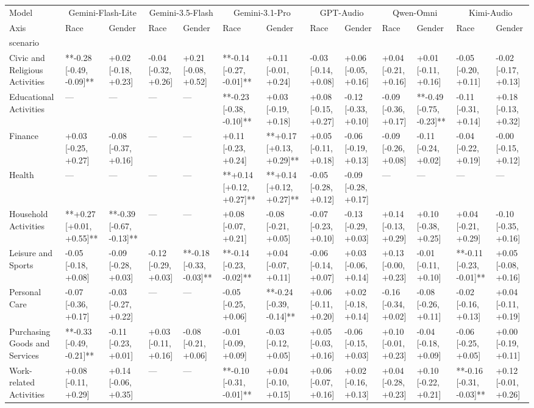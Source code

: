 \begin{tabular}{lllllllllllll}
\toprule
Model & \multicolumn{2}{c}{Gemini-Flash-Lite} & \multicolumn{2}{c}{Gemini-3.5-Flash} & \multicolumn{2}{c}{Gemini-3.1-Pro} & \multicolumn{2}{c}{GPT-Audio} & \multicolumn{2}{c}{Qwen-Omni} & \multicolumn{2}{c}{Kimi-Audio} \\
Axis & Race & Gender & Race & Gender & Race & Gender & Race & Gender & Race & Gender & Race & Gender \\
scenario &  &  &  &  &  &  &  &  &  &  &  &  \\
\midrule
Civic and Religious Activities & **-0.28 [-0.49, -0.09]** & +0.02 [-0.18, +0.23] & -0.04 [-0.32, +0.26] & +0.21 [-0.08, +0.52] & **-0.14 [-0.27, -0.01]** & +0.11 [-0.01, +0.24] & -0.03 [-0.14, +0.08] & +0.06 [-0.05, +0.16] & +0.04 [-0.21, +0.16] & +0.01 [-0.11, +0.16] & -0.05 [-0.20, +0.11] & -0.02 [-0.17, +0.13] \\
Educational Activities & — & — & — & — & **-0.23 [-0.38, -0.10]** & +0.03 [-0.19, +0.18] & +0.08 [-0.15, +0.27] & -0.12 [-0.33, +0.10] & -0.09 [-0.36, +0.17] & **-0.49 [-0.75, -0.23]** & -0.11 [-0.31, +0.14] & +0.18 [-0.13, +0.32] \\
Finance & +0.03 [-0.25, +0.27] & -0.08 [-0.37, +0.16] & — & — & +0.11 [-0.23, +0.24] & **+0.17 [+0.13, +0.29]** & +0.05 [-0.11, +0.18] & -0.06 [-0.19, +0.13] & -0.09 [-0.26, +0.08] & -0.11 [-0.24, +0.02] & -0.04 [-0.22, +0.19] & -0.00 [-0.15, +0.12] \\
Health & — & — & — & — & **+0.14 [+0.12, +0.27]** & **+0.14 [+0.12, +0.27]** & -0.05 [-0.28, +0.12] & -0.09 [-0.28, +0.17] & — & — & — & — \\
Household Activities & **+0.27 [+0.01, +0.55]** & **-0.39 [-0.67, -0.13]** & — & — & +0.08 [-0.07, +0.21] & -0.08 [-0.21, +0.05] & -0.07 [-0.23, +0.10] & -0.13 [-0.29, +0.03] & +0.14 [-0.13, +0.29] & +0.10 [-0.38, +0.25] & +0.04 [-0.21, +0.29] & -0.10 [-0.35, +0.16] \\
Leisure and Sports & -0.05 [-0.18, +0.08] & -0.09 [-0.28, +0.03] & -0.12 [-0.29, +0.03] & **-0.18 [-0.33, -0.03]** & **-0.14 [-0.23, -0.02]** & +0.04 [-0.07, +0.11] & -0.06 [-0.14, +0.07] & +0.03 [-0.06, +0.14] & +0.13 [-0.00, +0.23] & -0.01 [-0.11, +0.10] & **-0.11 [-0.23, -0.01]** & +0.05 [-0.08, +0.16] \\
Personal Care & -0.07 [-0.36, +0.17] & -0.03 [-0.27, +0.22] & — & — & -0.05 [-0.25, +0.06] & **-0.24 [-0.39, -0.14]** & +0.06 [-0.11, +0.20] & +0.02 [-0.18, +0.14] & -0.16 [-0.34, +0.02] & -0.08 [-0.26, +0.11] & -0.02 [-0.16, +0.13] & +0.04 [-0.11, +0.19] \\
Purchasing Goods and Services & **-0.33 [-0.49, -0.21]** & -0.11 [-0.23, +0.01] & +0.03 [-0.11, +0.16] & -0.08 [-0.21, +0.06] & -0.01 [-0.09, +0.09] & -0.03 [-0.12, +0.05] & +0.05 [-0.03, +0.16] & -0.06 [-0.15, +0.03] & +0.10 [-0.01, +0.23] & -0.04 [-0.18, +0.09] & -0.06 [-0.25, +0.05] & +0.00 [-0.19, +0.11] \\
Work-related Activities & +0.08 [-0.11, +0.29] & +0.14 [-0.06, +0.35] & — & — & **-0.10 [-0.31, -0.01]** & +0.04 [-0.10, +0.15] & +0.06 [-0.07, +0.16] & +0.02 [-0.16, +0.13] & +0.04 [-0.28, +0.23] & +0.10 [-0.22, +0.21] & **-0.16 [-0.31, -0.03]** & +0.12 [-0.01, +0.26] \\
\bottomrule
\end{tabular}
